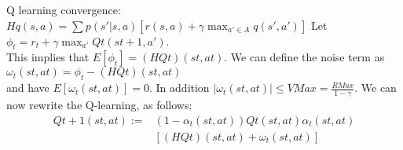 \begin{deff}
Q learning convergence: 
$Hq(s, a) = \sum p(s' |s, a) [r(s, a) + \gamma \max_{a'\in A} q(s', a')]$
Let $
\phi_t = r_t + \gamma \max_{a'}Qt(st+1 , a')$.\\
This implies that $
E[\phi_t] = (HQt)(st , at).$
We can define the noise term as \\
$\omega_t(st , at) = \phi_t - (HQt)(st , at)
$
\\and have $
E[\omega_t(st , at)] = 0$.
In addition $
|\omega_t(st , at)| \leq VMax = \frac{RMax}{1-\gamma}.$
We can now rewrite the Q-learning, as follows: 
\begin{align*}
Qt+1(st , at) := &(1 - \alpha_t(st , at))Qt(st , at)  \alpha_t(st , at)\\&[(HQt)(st , at) + \omega_t(st , at)]
\end{align*}
\end{deff}
